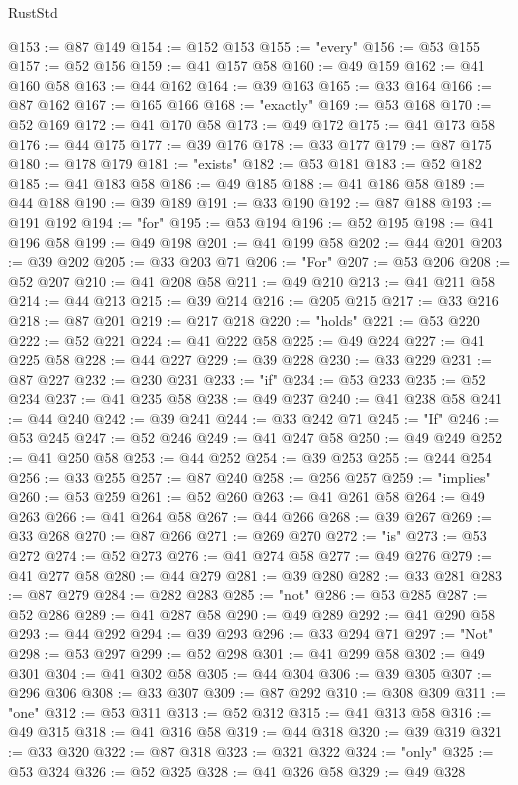 \begin{lexlean}{RustStd}
\begin{coremodule}
@153 := @87 @149
@154 := @152 @153
@155 := "every"
@156 := @53 @155
@157 := @52 @156
@159 := @41 @157 @58
@160 := @49 @159
@162 := @41 @160 @58
@163 := @44 @162
@164 := @39 @163
@165 := @33 @164
@166 := @87 @162
@167 := @165 @166
@168 := "exactly"
@169 := @53 @168
@170 := @52 @169
@172 := @41 @170 @58
@173 := @49 @172
@175 := @41 @173 @58
@176 := @44 @175
@177 := @39 @176
@178 := @33 @177
@179 := @87 @175
@180 := @178 @179
@181 := "exists"
@182 := @53 @181
@183 := @52 @182
@185 := @41 @183 @58
@186 := @49 @185
@188 := @41 @186 @58
@189 := @44 @188
@190 := @39 @189
@191 := @33 @190
@192 := @87 @188
@193 := @191 @192
@194 := "for"
@195 := @53 @194
@196 := @52 @195
@198 := @41 @196 @58
@199 := @49 @198
@201 := @41 @199 @58
@202 := @44 @201
@203 := @39 @202
@205 := @33 @203 @71
@206 := "For"
@207 := @53 @206
@208 := @52 @207
@210 := @41 @208 @58
@211 := @49 @210
@213 := @41 @211 @58
@214 := @44 @213
@215 := @39 @214
@216 := @205 @215
@217 := @33 @216
@218 := @87 @201
@219 := @217 @218
@220 := "holds"
@221 := @53 @220
@222 := @52 @221
@224 := @41 @222 @58
@225 := @49 @224
@227 := @41 @225 @58
@228 := @44 @227
@229 := @39 @228
@230 := @33 @229
@231 := @87 @227
@232 := @230 @231
@233 := "if"
@234 := @53 @233
@235 := @52 @234
@237 := @41 @235 @58
@238 := @49 @237
@240 := @41 @238 @58
@241 := @44 @240
@242 := @39 @241
@244 := @33 @242 @71
@245 := "If"
@246 := @53 @245
@247 := @52 @246
@249 := @41 @247 @58
@250 := @49 @249
@252 := @41 @250 @58
@253 := @44 @252
@254 := @39 @253
@255 := @244 @254
@256 := @33 @255
@257 := @87 @240
@258 := @256 @257
@259 := "implies"
@260 := @53 @259
@261 := @52 @260
@263 := @41 @261 @58
@264 := @49 @263
@266 := @41 @264 @58
@267 := @44 @266
@268 := @39 @267
@269 := @33 @268
@270 := @87 @266
@271 := @269 @270
@272 := "is"
@273 := @53 @272
@274 := @52 @273
@276 := @41 @274 @58
@277 := @49 @276
@279 := @41 @277 @58
@280 := @44 @279
@281 := @39 @280
@282 := @33 @281
@283 := @87 @279
@284 := @282 @283
@285 := "not"
@286 := @53 @285
@287 := @52 @286
@289 := @41 @287 @58
@290 := @49 @289
@292 := @41 @290 @58
@293 := @44 @292
@294 := @39 @293
@296 := @33 @294 @71
@297 := "Not"
@298 := @53 @297
@299 := @52 @298
@301 := @41 @299 @58
@302 := @49 @301
@304 := @41 @302 @58
@305 := @44 @304
@306 := @39 @305
@307 := @296 @306
@308 := @33 @307
@309 := @87 @292
@310 := @308 @309
@311 := "one"
@312 := @53 @311
@313 := @52 @312
@315 := @41 @313 @58
@316 := @49 @315
@318 := @41 @316 @58
@319 := @44 @318
@320 := @39 @319
@321 := @33 @320
@322 := @87 @318
@323 := @321 @322
@324 := "only"
@325 := @53 @324
@326 := @52 @325
@328 := @41 @326 @58
@329 := @49 @328

\end{coremodule}
\end{lexlean}
